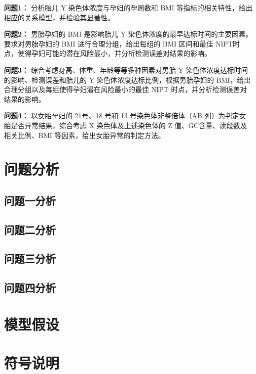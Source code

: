 \documentclass[withoutpreface,bwprint]{cumcmthesis} %
\begin{document}
\textbf{问题1：}
分析胎儿 Y 染色体浓度与孕妇的孕周数和 BMI 等指标的相关特性，给出相应的关系模型，并检验其显著性。

\textbf{问题2：}
男胎孕妇的 BMI 是影响胎儿 Y 染色体浓度的最早达标时间的主要因素。要求对男胎孕妇的 BMI 进行合理分组，给出每组的 BMI 区间和最佳 NIPT时点，使得孕妇可能的潜在风险最小，并分析检测误差对结果的影响。

\textbf{问题3：}
综合考虑身高、体重、年龄等等多种因素对男胎 Y 染色体浓度达标时间的影响、检测误差和胎儿的 Y 染色体浓度达标比例，根据男胎孕妇的 BMI，给出合理分组以及每组使得孕妇潜在风险最小的最佳 NIPT 时点，并分析检测误差对结果的影响。

\textbf{问题4：}
以女胎孕妇的 21号、18 号和 13 号染色体非整倍体（AB 列）为判定女胎是否异常结果，综合考虑 X 染色体及上述染色体的 Z 值、GC含量、读段数及相关比例、BMI 等因素，给出女胎异常的判定方法。





\section{问题分析}
\subsection{问题一分析}

\subsection{问题二分析}

\subsection{问题三分析}

\subsection{问题四分析}


\section{模型假设}




\section{符号说明}


\end{document}
